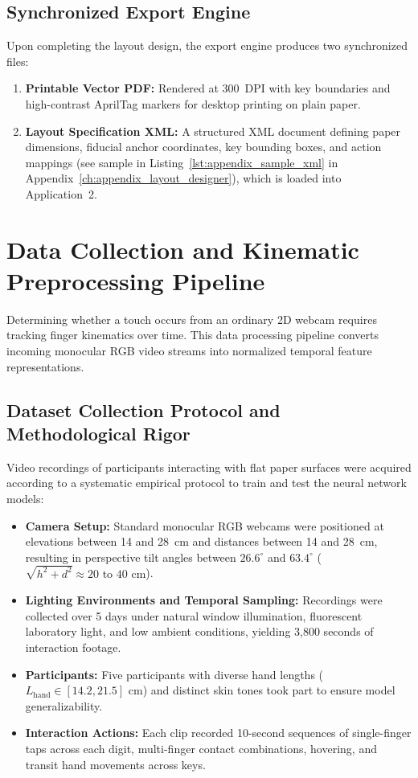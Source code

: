 \subsection{Synchronized Export Engine}
\label{subsec:meth_export_engine}
Upon completing the layout design, the export engine produces two synchronized files:
\begin{enumerate}
    \item \textbf{Printable Vector PDF:} Rendered at 300~DPI with key boundaries and high-contrast AprilTag markers for desktop printing on plain paper.
    \item \textbf{Layout Specification XML:} A structured XML document defining paper dimensions, fiducial anchor coordinates, key bounding boxes, and action mappings (see sample in Listing~\ref{lst:appendix_sample_xml} in Appendix~\ref{ch:appendix_layout_designer}), which is loaded into Application~2.
\end{enumerate}

\section{Data Collection and Kinematic Preprocessing Pipeline}
\label{sec:meth_data_pipeline}
Determining whether a touch occurs from an ordinary 2D webcam requires tracking finger kinematics over time. This data processing pipeline converts incoming monocular RGB video streams into normalized temporal feature representations.

\subsection{Dataset Collection Protocol and Methodological Rigor}
\label{subsec:meth_dataset_capture}
Video recordings of participants interacting with flat paper surfaces were acquired according to a systematic empirical protocol to train and test the neural network models:
\begin{itemize}
    \item \textbf{Camera Setup:} Standard monocular RGB webcams were positioned at elevations between 14 and 28~cm and distances between 14 and 28~cm, resulting in perspective tilt angles between $26.6^\circ$ and $63.4^\circ$ ($\sqrt{h^2+d^2} \approx 20\text{ to }40\text{ cm}$).
    \item \textbf{Lighting Environments and Temporal Sampling:} Recordings were collected over 5 days under natural window illumination, fluorescent laboratory light, and low ambient conditions, yielding 3,800 seconds of interaction footage.
    \item \textbf{Participants:} Five participants with diverse hand lengths ($L_{\text{hand}} \in [14.2, 21.5]\text{ cm}$) and distinct skin tones took part to ensure model generalizability.
    \item \textbf{Interaction Actions:} Each clip recorded 10-second sequences of single-finger taps across each digit, multi-finger contact combinations, hovering, and transit hand movements across keys.
\end{itemize}


